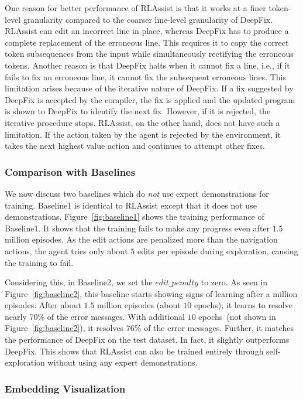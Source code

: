 \documentclass{article}
\begin{document}
One reason for better performance of RLAssist is that it works at a finer token-level granularity compared to the coarser line-level granularity of DeepFix.
RLAssist can edit an incorrect line in place, whereas DeepFix has to
produce a complete replacement of the erroneous line. This requires it to
copy the correct token subsequences from the input while simultaneously rectifying
the erroneous tokens.
Another reason is that DeepFix halts when it cannot fix a line, i.e., if it fails to fix an erroneous line, it cannot fix the subsequent erroneous lines.
This limitation arises because of the iterative nature of DeepFix.
If a fix suggested by DeepFix is accepted by the compiler, the fix is applied and the updated program is shown to
DeepFix to identify the next fix.
However, if it is rejected, the iterative procedure stops.
RLAssist, on the other hand, does not have such a limitation.
If the action taken by the agent is rejected by the environment, it takes the next highest value action and continues to attempt other fixes.

\subsubsection{Comparison with Baselines}

We now discuss two baselines which do \emph{not} use expert demonstrations for training.
Baseline1 is identical to RLAssist except that it does not use demonstrations.
Figure~\ref{fig:baseline1} shows the training performance of Baseline1. It shows that the training fails to make any progress even after $ 1.5 $ million episodes.
As the edit actions are penalized more than the navigation actions, the agent tries only about $ 5 $ edits per episode during exploration, causing the training to fail.

Considering this, in Baseline2, we set the $ edit\_penalty $ to zero.
As seen in Figure~\ref{fig:baseline2}, this baseline
starts showing signs of learning after a million episodes.
After about $ 1.5 $ million episodes (about $10$ epochs), it learns to resolve nearly $ 70\% $ of the error messages.
With additional $ 10 $ epochs~(not shown in Figure~\ref{fig:baseline2}), it resolves $ 76\% $ of the error messages.
Further, it matches the performance of DeepFix on the test dataset.
In fact, it slightly outperforms DeepFix.
This shows that RLAssist can also be trained entirely through self-exploration without using any expert demonstrations.

\subsubsection{Embedding Visualization}
\end{document}
